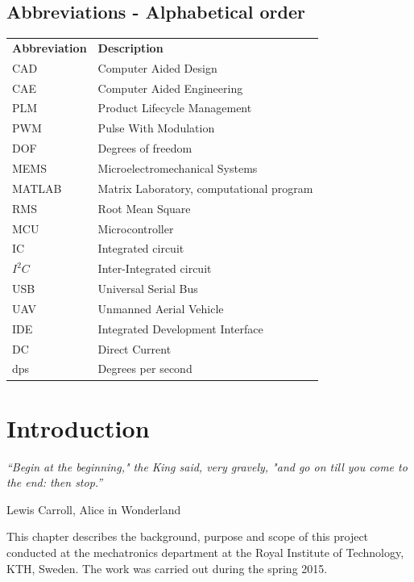 \documentclass[a4paper,11pt]{kth-mag}
\begin{document}
\section*{Abbreviations - Alphabetical order}
\noindent{}\begin{tabular}{@{}p{2.5cm}l}
\textbf{Abbreviation} 	& \textbf{Description} \vspace{.5em} \\
CAD			& Computer Aided Design \\
CAE			& Computer Aided Engineering\\
PLM			& Product Lifecycle Management\\
PWM			& Pulse With Modulation\\
DOF			& Degrees of freedom\\
MEMS			& Microelectromechanical Systems \\
MATLAB		& Matrix Laboratory, computational program\\
RMS			& Root Mean Square\\
MCU			& Microcontroller\\
IC			& Integrated circuit\\
$I^2C$		& Inter-Integrated circuit\\
USB			& Universal Serial Bus \\
UAV			& Unmanned Aerial Vehicle\\
IDE 			& Integrated Development Interface \\
DC			& Direct Current \\
dps			& Degrees per second
\end{tabular}
\cleardoublepage

\mainmatter
\pagestyle{newchap}




\chapter{Introduction}

\epigraph{\textit{“Begin at the beginning," the King said, very gravely, "and go on till you come to the end: then stop.”}}{Lewis Carroll, Alice in Wonderland}

This chapter describes the background, purpose and scope of this project conducted at the mechatronics department at the Royal Institute of Technology, KTH, Sweden. The work was carried out during the spring 2015.
\end{document}
